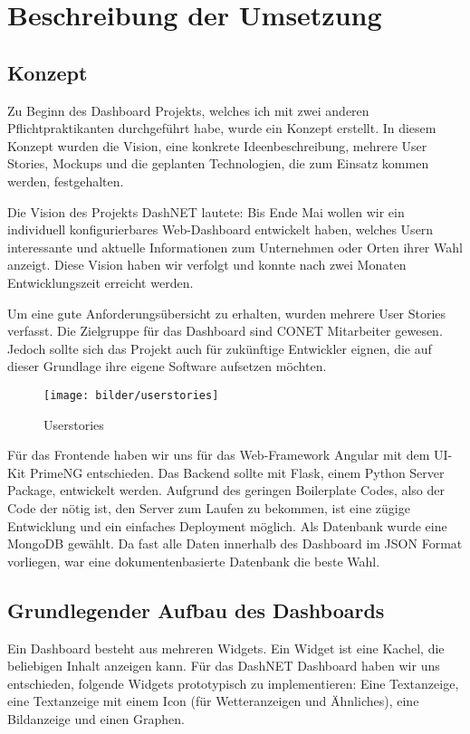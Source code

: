 \section{Beschreibung der Umsetzung}
\subsection{Konzept}
Zu Beginn des Dashboard Projekts, welches ich mit zwei anderen Pflichtpraktikanten durchgeführt habe, wurde ein Konzept erstellt. In diesem Konzept wurden die Vision, eine konkrete Ideenbeschreibung, mehrere User Stories, Mockups und die geplanten Technologien, die zum Einsatz kommen werden, festgehalten. 

Die Vision des Projekts DashNET lautete: \glqq Bis Ende Mai wollen wir ein individuell konfigurierbares Web-Dashboard entwickelt haben, welches Usern interessante und aktuelle Informationen zum Unternehmen oder Orten ihrer Wahl anzeigt.\grqq{} Diese Vision haben wir verfolgt und konnte nach zwei Monaten Entwicklungszeit erreicht werden. 

Um eine gute Anforderungsübersicht zu erhalten, wurden mehrere User Stories verfasst. Die Zielgruppe für das Dashboard sind CONET Mitarbeiter gewesen. Jedoch sollte sich das Projekt auch für zukünftige Entwickler eignen, die auf dieser Grundlage ihre eigene Software aufsetzen möchten. 

\begin{figure}[H]
  \centering
    \texttt{[image: bilder/userstories]}
    \caption{Userstories}
\end{figure}

Für das Frontende haben wir uns für das Web-Framework Angular mit dem UI-Kit PrimeNG entschieden. Das Backend sollte mit Flask, einem Python Server Package, entwickelt werden. Aufgrund des geringen Boilerplate Codes, also der Code der nötig ist, den Server zum Laufen zu bekommen, ist eine zügige Entwicklung und ein einfaches Deployment möglich. Als Datenbank wurde eine MongoDB gewählt. Da fast alle Daten innerhalb des Dashboard im JSON Format vorliegen, war eine dokumentenbasierte Datenbank die beste Wahl.

\subsection{Grundlegender Aufbau des Dashboards}
Ein Dashboard besteht aus mehreren Widgets. Ein Widget ist eine Kachel, die beliebigen Inhalt anzeigen kann. Für das DashNET Dashboard haben wir uns entschieden, folgende Widgets prototypisch zu implementieren: Eine Textanzeige, eine Textanzeige mit einem Icon (für Wetteranzeigen und Ähnliches), eine Bildanzeige und einen Graphen.

